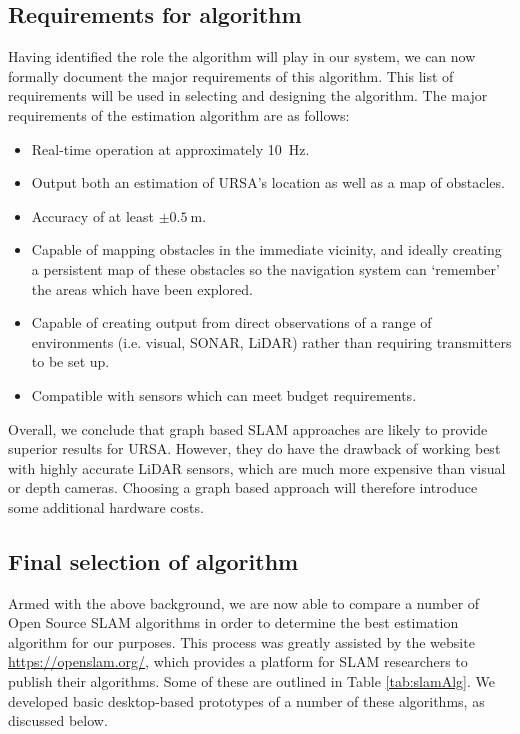 \documentclass[capstone_report.tex]{subfiles}
\begin{document}
    \subsection{Requirements for algorithm}
    Having identified the role the algorithm will play in our system, we can now formally document the major requirements of this algorithm. This list of requirements will be used in selecting and designing the algorithm. The major requirements of the estimation algorithm are as follows:

    \begin{itemize}
    	\item Real-time operation at approximately \SI{10}{\hertz}.
    	\item Output both an estimation of URSA's location as well as a map of obstacles.
    	\item Accuracy of at least $\pm \SI{0.5}{\meter}$.
    	\item Capable of mapping obstacles in the immediate vicinity, and ideally creating a persistent map of these obstacles so the navigation system can `remember' the areas which have been explored.
    	\item Capable of creating output from direct observations of a range of environments (i.e. visual, SONAR, LiDAR) rather than requiring transmitters to be set up.
    	\item Compatible with sensors which can meet budget requirements.
    \end{itemize}

	Overall, we conclude that graph based SLAM approaches are likely to provide superior results for URSA. However, they do have the drawback of working best with highly accurate LiDAR sensors, which are much more expensive than visual or depth cameras. Choosing a graph based approach will therefore introduce some additional hardware costs.

	\subsection{Final selection of algorithm}
	Armed with the above background, we are now able to compare a number of Open Source SLAM algorithms in order to determine the best estimation algorithm for our purposes. This process was greatly assisted by the website \url{https://openslam.org/}, which provides a platform for SLAM researchers to publish their algorithms. Some of these are outlined in Table \ref{tab:slamAlg}. We developed basic desktop-based prototypes of a number of these algorithms, as discussed below.
\end{document}
